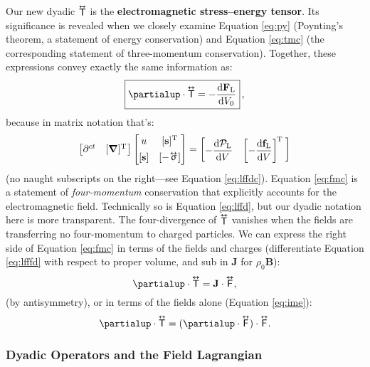 \documentclass[12pt]{article}
\renewcommand{\vv}[1]{\mathbf{#1}}
\newcommand{\dd}[1]{\mathrm{d}#1}
\newcommand{\del}{\boldsymbol{\nabla}}
\newcommand{\tightoverset}[2]{%
  \mathop{#2}\limits^{\vbox to -.5ex{\kern-0.75ex\hbox{$#1$}\vss}}}
\newcommand{\inlinedy}[1]{\tightoverset{\text{\tiny$\bm\leftrightarrow$}}{#1}}
\newcommand{\capdy}[1]{ \overset{ \text{\tiny$\bm\leftrightarrow$} }{\vphantom{\text{\small{A}}}\smash{#1}} }
\begin{document}
Our new dyadic $\inlinedy{\mathsf{T}}$ is the \textbf{electromagnetic stress--energy tensor}. Its significance is revealed when we closely examine Equation \ref{eq:py} (Poynting's theorem, a statement of energy conservation) and Equation \ref{eq:tmc} (the corresponding statement of three-momentum conservation). Together, these expressions convey exactly the same information as:
\begin{equation}\label{eq:fmc}
\boxed{ \partialup \cdot \capdy{\mathsf{T}} = - \dfrac{\dd \vv F_{\mathrm{L}}}{\dd V_0} } \, ,
\end{equation}
because in matrix notation that's:
\begin{equation*}
\begin{bmatrix}
\partial^{ct} & [ \del ]^{\mathrm{T}} \mkern1mu
\end{bmatrix}
\begin{bmatrix}
u & [\vv s]^{\mathrm{T}} \\[1ex]
[\vv s] & [ - \mkern-2mu \inlinedy{\upsigma} \mkern1mu ]
\end{bmatrix}
=
\begin{bmatrix}
- \dfrac{\dd \mathcal{P}_{\textrm{L}}}{\dd V} & \left[ - \dfrac{\dd \vv f_{\mathrm{L}}}{\dd V} \right] ^{\mkern-2mu \mathrm{T} \; }
\end{bmatrix}
\end{equation*}
(no naught subscripts on the right---see Equation \ref{eq:lffdc}). Equation \ref{eq:fmc} is a statement of \emph{four-momentum} conservation that explicitly accounts for the electromagnetic field. Technically so is Equation \ref{eq:lffd}, but our dyadic notation here is more transparent. The four-divergence of $\inlinedy{\mathsf{T}}$ vanishes when the fields are transferring no four-momentum to charged particles. We can express the right side of Equation \ref{eq:fmc} in terms of the fields and charges (differentiate Equation \ref{eq:lfffd} with respect to proper volume, and sub in $\vv J$ for $\rho_0 \vv B$):
\begin{equation*}
\partialup \cdot \capdy{\mathsf{T}} = \vv J \cdot \capdy{\mathsf{F}} ,
\end{equation*}
(by antisymmetry), or in terms of the fields alone (Equation \ref{eq:ime}):
\begin{equation*}
\partialup \cdot \capdy{\mathsf{T}} = ( \partialup \cdot \capdy{\mathsf{F}} ) \cdot \capdy{\mathsf{F}} .
\end{equation*}

\subsubsection{Dyadic Operators and the Field Lagrangian}
\end{document}
